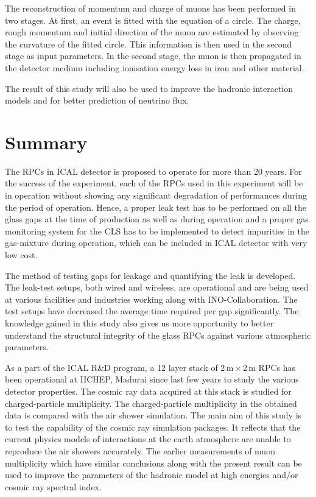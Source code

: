 \documentclass[a4paper,12pt,twoside,openany]{article}
\begin{document}
The reconstruction of momentum and charge of muons has been performed
in two stages. At first, an event is fitted with the equation of a
circle. The charge, rough momentum and initial direction of the muon
are estimated by observing the curvature of the fitted circle. This
information is then used in the second stage as input parameters. In
the second stage, the muon is then propagated in the detector medium
including ionisation energy loss in iron and other material.

The result of this study will also be used to improve the hadronic
interaction models and for better prediction of neutrino flux.

\section{Summary}
The RPCs in ICAL detector is proposed to operate for more than 20
years. For the success of the experiment, each of the RPCs used in
this experiment will be in operation without showing any significant
degradation of performances during the period of operation. Hence, a
proper leak test has to be performed on all the glass gaps at the time
of production as well as during operation and a proper gas monitoring
system for the CLS has to be implemented to detect impurities in the
gas-mixture during operation, which can be included in ICAL detector
with very low cost.

The method of testing gaps for leakage and quantifying the leak is
developed. The leak-test setups, both wired and wireless, are
operational and are being used at various facilities and industries
working along with INO-Collaboration. The test setups have decreased
the average time required per gap significantly. The knowledge gained
in this study also gives us more opportunity to better understand the
structural integrity of the glass RPCs against various atmospheric
parameters.

As a part of the ICAL R\&D program, a 12 layer stack of
2\,m\,$\times$\,2\,m RPCs has been operational at IICHEP, Madurai
since last few years to study the various detector properties. The
cosmic ray data acquired at this stack is studied for charged-particle
multiplicity. The charged-particle multiplicity in the obtained data
is compared with the air shower simulation. The main aim of this study
is to test the capability of the cosmic ray simulation packages. It
reflects that the current physics models of interactions at the earth
atmosphere are unable to reproduce the air showers accurately. The
earlier measurements of muon multiplicity which have similar
conclusions along with the present result can be used to improve the
parameters of the hadronic model at high energies and/or cosmic ray
spectral index.
\end{document}
